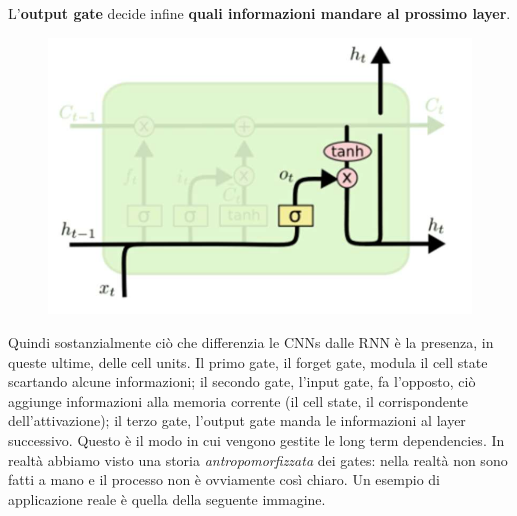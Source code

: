 L'\textbf{output gate} decide infine \textbf{quali informazioni mandare 
al prossimo layer}.
\begin{figure}[!h]
   \includegraphics[scale=.5]{images/rnn/output_gate.png}
   \centering
\end{figure}
\newpage
Quindi sostanzialmente ciò che differenzia le CNNs dalle RNN è la presenza, in queste ultime,
delle cell units. Il primo gate, il forget gate, modula il cell state scartando alcune informazioni;
il secondo gate, l'input gate, fa l'opposto, ciò aggiunge informazioni alla memoria corrente (il 
cell state, il corrispondente dell'attivazione); il terzo gate, l'output gate manda le informazioni
al layer successivo. Questo è il modo in cui vengono gestite le long term dependencies.
\newline
\newline
In realtà abbiamo visto una storia \textit{antropomorfizzata} dei gates:
nella realtà non sono fatti a mano e il processo non è ovviamente così chiaro. Un esempio di applicazione 
reale è quella della seguente immagine. 
